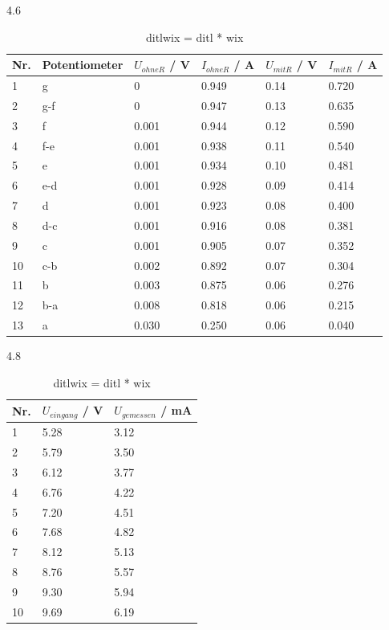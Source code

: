 \documentclass[12pt,a4paper,twoside]{article}
\begin{document}
4.6
\begin{table}[H]
    \centering
    \caption{ditlwix = ditl * wix}
    \label{tab:Messdaten d Solar}
    \begin{tabular}{| l | l | l | l | l | l |}
        \hline
        Nr. & Potentiometer & $U_{ohneR}$  / V & $I_{ohneR}$ / A & $U_{mitR}$ / V & $I_{mitR}$ / A \\
        \hline
        1  & g    & 0     & 0.949 & 0.14 & 0.720  \\
        2  & g-f  & 0     & 0.947 & 0.13 & 0.635  \\
        3  & f    & 0.001 & 0.944 & 0.12 & 0.590  \\
        4  & f-e  & 0.001 & 0.938 & 0.11 & 0.540  \\
        5  & e    & 0.001 & 0.934 & 0.10 & 0.481  \\
        6  & e-d  & 0.001 & 0.928 & 0.09 & 0.414  \\
        7  & d    & 0.001 & 0.923 & 0.08 & 0.400  \\
        8  & d-c  & 0.001 & 0.916 & 0.08 & 0.381  \\
        9  & c    & 0.001 & 0.905 & 0.07 & 0.352  \\
        10 & c-b  & 0.002 & 0.892 & 0.07 & 0.304  \\
        11 & b    & 0.003 & 0.875 & 0.06 & 0.276  \\
        12 & b-a  & 0.008 & 0.818 & 0.06 & 0.215  \\
        13 & a    & 0.030 & 0.250 & 0.06 & 0.040  \\
        \hline  
    \end{tabular}
\end{table}

4.8 
\begin{table}[H]
    \centering
    \caption{ditlwix = ditl * wix}
    \label{tab:Messdaten 4.8}
    \begin{tabular}{| l | l | l |}
        \hline
        Nr. & $U_{eingang}$ / V & $U_{gemessen}$ / mA \\
        \hline
        1  & 5.28  & 3.12 \\
        2  & 5.79  & 3.50 \\
        3  & 6.12  & 3.77  \\
        4  & 6.76  & 4.22  \\
        5  & 7.20  & 4.51  \\
        6  & 7.68  & 4.82  \\
        7  & 8.12  & 5.13  \\
        8  & 8.76  & 5.57  \\
        9  & 9.30  & 5.94  \\
        10 & 9.69  & 6.19  \\
 
        \hline  
    \end{tabular}
\end{table}
\end{document}
